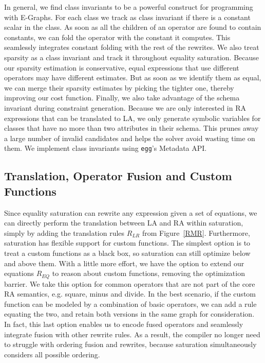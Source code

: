 In general, we find class invariants to be a powerful construct for programming
with E-Graphs. For each class we track as class invariant if there is a constant
scalar in the class. As soon as all the children of an operator are found to
contain constants, we can fold the operator with the constant it computes. This
seamlessly integrates constant folding with the rest of the rewrites. We also
treat sparsity as a class invariant and track it throughout equality saturation.
Because our sparsity estimation is conservative, equal expressions that use
different operators may have different estimates. But as soon as we identify
them as equal, we can merge their sparsity estimates by picking the tighter one,
thereby improving our cost function. Finally, we also take advantage of the
schema invariant during constraint generation. Because we are only interested in
RA expressions that can be translated to LA, we only generate symbolic variables
for classes that have no more than two attributes in their schema. This prunes
away a large number of invalid candidates and helps the solver avoid wasting
time on them. We implement class invariants using \texttt{egg}'s Metadata API.

\subsection{Translation, Operator Fusion and Custom Functions}
Since equality saturation can rewrite any expression given a set of equations,
we can directly perform the translation between LA and RA within saturation,
simply by adding the translation rules $R_{LR}$ from Figure~\ref{RMR}.
Furthermore, saturation has flexible support for custom functions. The simplest
option is to treat a custom functions as a black box, so saturation can still
optimize below and above them. With a little more effort, we have the option to
extend our equations $R_{EQ}$ to reason about custom functions, removing the
optimization barrier. We take this option for common operators that are not part
of the core RA semantics, e.g. square, minus and divide. In the best scenario,
if the custom function can be modeled by a combination of basic operators, we
can add a rule equating the two, and retain both versions in the same graph for
consideration. In fact, this last option enables us to encode fused operators
and seamlessly integrate fusion with other rewrite rules. As a result, the
compiler no longer need to struggle with ordering fusion and rewrites, because
saturation simultaneously considers all possible ordering.

